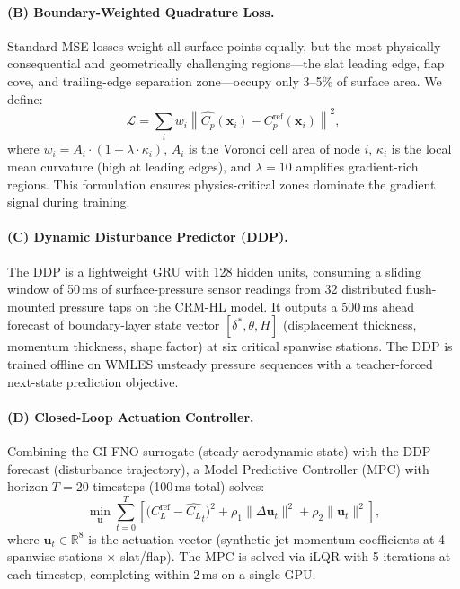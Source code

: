\documentclass[10pt,twocolumn,letterpaper]{article}
\newcommand{\CL}{C_L}
\newcommand{\Cp}{C_p}
\begin{document}
\paragraph{(B) Boundary-Weighted Quadrature Loss.}
Standard MSE losses weight all surface points equally, but the most
physically consequential and geometrically challenging regions—the
slat leading edge, flap cove, and trailing-edge separation
zone—occupy only 3–5\% of surface area. We define:
\begin{equation}
  \mathcal{L} = \sum_{i} w_i \left\|
    \hat{\Cp}(\mathbf{x}_i) - \Cp^{\text{ref}}(\mathbf{x}_i)
  \right\|^2,
  \label{eq:loss}
\end{equation}
where $w_i = A_i \cdot (1 + \lambda \cdot \kappa_i)$, $A_i$ is the
Voronoi cell area of node $i$, $\kappa_i$ is the local mean curvature
(high at leading edges), and $\lambda=10$ amplifies gradient-rich
regions. This formulation ensures physics-critical zones dominate the
gradient signal during training.

\paragraph{(C) Dynamic Disturbance Predictor (DDP).}
The DDP is a lightweight GRU \cite{Cho2014GRU} with 128 hidden units,
consuming a sliding window of 50\,ms of surface-pressure sensor
readings from 32 distributed flush-mounted pressure taps on the
CRM-HL model. It outputs a 500\,ms ahead forecast of boundary-layer
state vector $[\delta^*, \theta, H]$ (displacement thickness,
momentum thickness, shape factor) at six critical spanwise stations.
The DDP is trained offline on WMLES unsteady pressure sequences with
a teacher-forced next-state prediction objective.

\paragraph{(D) Closed-Loop Actuation Controller.}
Combining the GI-FNO surrogate (steady aerodynamic state) with the
DDP forecast (disturbance trajectory), a Model Predictive Controller
(MPC) with horizon $T=20$ timesteps (100\,ms total) solves:
\begin{equation}
  \min_{\mathbf{u}} \sum_{t=0}^{T}\!\left[
    \bigl(\CL^{\text{ref}} - \hat{\CL}_t\bigr)^2
    + \rho_1 \|\Delta\mathbf{u}_t\|^2
    + \rho_2 \|\mathbf{u}_t\|^2
  \right],
\end{equation}
where $\mathbf{u}_t \in \mathbb{R}^8$ is the actuation vector
(synthetic-jet momentum coefficients at 4 spanwise stations $\times$
slat/flap). The MPC is solved via iLQR with 5 iterations at each
timestep, completing within 2\,ms on a single GPU.
\end{document}
